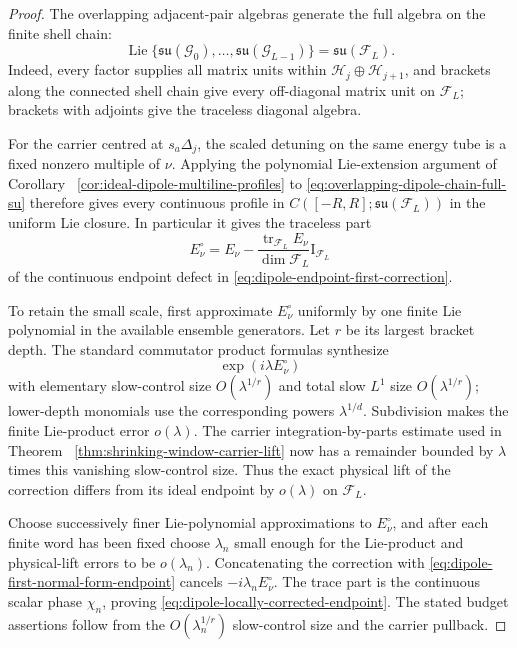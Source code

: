 \documentclass[11pt]{article}
\theoremstyle{remark}
\newcommand{\Id}{\mathrm I}
\begin{document}
\begin{proof}
The overlapping adjacent-pair algebras generate the full algebra on the
finite shell chain:
\begin{equation}
 \operatorname{Lie}\{
 \mathfrak{su}(\mathcal G_0),\ldots,
 \mathfrak{su}(\mathcal G_{L-1})\}
 =\mathfrak{su}(\mathcal F_L).
 \label{eq:overlapping-dipole-chain-full-su}
\end{equation}
Indeed, every factor supplies all matrix units within
$\mathcal H_j\oplus\mathcal H_{j+1}$, and brackets along the connected shell
chain give every off-diagonal matrix unit on $\mathcal F_L$; brackets with
adjoints give the traceless diagonal algebra.

For the carrier centred at $s_a\Delta_j$, the scaled detuning on the same
energy tube is a fixed nonzero multiple of $\nu$.  Applying the polynomial
Lie-extension argument of Corollary
~\ref{cor:ideal-dipole-multiline-profiles} to
\eqref{eq:overlapping-dipole-chain-full-su} therefore gives every continuous
profile in $C([-R,R];\mathfrak{su}(\mathcal F_L))$ in the uniform Lie
closure.  In particular it gives the traceless part
\[
 E_\nu^\circ
 =E_\nu-\frac{\operatorname{tr}_{\mathcal F_L}E_\nu}
 {\dim\mathcal F_L}\Id_{\mathcal F_L}
\]
of the continuous endpoint defect in
\eqref{eq:dipole-endpoint-first-correction}.

To retain the small scale, first approximate $E_\nu^\circ$ uniformly by one
finite Lie polynomial in the available ensemble generators.  Let $r$ be its
largest bracket depth.  The standard commutator product formulas synthesize
\[
 \exp(i\lambda E_\nu^\circ)
\]
with elementary slow-control size $O(\lambda^{1/r})$ and total slow
$L^1$ size $O(\lambda^{1/r})$; lower-depth monomials use the corresponding
powers $\lambda^{1/d}$.  Subdivision makes the finite Lie-product error
$o(\lambda)$.  The carrier integration-by-parts estimate used in Theorem
~\ref{thm:shrinking-window-carrier-lift} now has a remainder bounded by
$\lambda$ times this vanishing slow-control size.  Thus the exact physical
lift of the correction differs from its ideal endpoint by
$o(\lambda)$ on $\mathcal F_L$.

Choose successively finer Lie-polynomial approximations to
$E_\nu^\circ$, and after each finite word has been fixed choose
$\lambda_n$ small enough for the Lie-product and physical-lift errors to be
$o(\lambda_n)$.  Concatenating the correction with
\eqref{eq:dipole-first-normal-form-endpoint} cancels
$-i\lambda_nE_\nu^\circ$.  The trace part is the continuous scalar phase
$\chi_n$, proving \eqref{eq:dipole-locally-corrected-endpoint}.  The stated
budget assertions follow from the $O(\lambda_n^{1/r})$ slow-control size and
the carrier pullback.
\end{proof}
\end{document}
